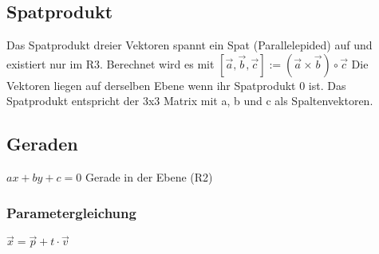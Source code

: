 \documentclass[11pt,a4paper,onecolumn]{scrartcl}
\begin{document}
\begin{flushleft}
\subsection{Spatprodukt}
Das Spatprodukt dreier Vektoren spannt ein Spat (Parallelepided) auf und existiert nur im R3. Berechnet wird es mit \linebreak
$[\vec{a},\vec{b},\vec{c}] := (\vec{a}\times\vec{b})\circ \vec{c}$ \linebreak
Die Vektoren liegen auf derselben Ebene wenn ihr Spatprodukt 0 ist.\linebreak
Das Spatprodukt entspricht der 3x3 Matrix mit a, b und c als Spaltenvektoren.

\subsection{Geraden}
$ax + by + c = 0 $ Gerade in der Ebene (R2)

\subsubsection{Parametergleichung}
$\vec{x} = \vec{p} + t \cdot \vec{v}$


\end{flushleft}
\end{document}
